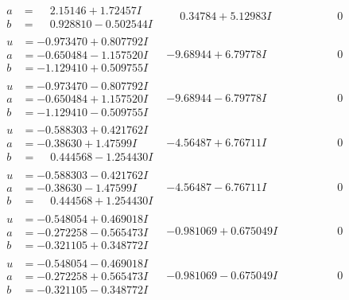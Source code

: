 \documentclass[1p]{elsarticle_modified}
\theoremstyle{definition}
\begin{document}
$$\begin{array}{c|c|c}
\begin{aligned}
a &= \phantom{-}2.15146 + 1.72457 I \\
b &= \phantom{-}0.928810 - 0.502544 I\end{aligned}
 & \phantom{-}0.34784 + 5.12983 I & \phantom{-0.000000 } 0 \\ \hline\begin{aligned}
u &= -0.973470 + 0.807792 I \\
a &= -0.650484 - 1.157520 I \\
b &= -1.129410 + 0.509755 I\end{aligned}
 & -9.68944 + 6.79778 I & \phantom{-0.000000 } 0 \\ \hline\begin{aligned}
u &= -0.973470 - 0.807792 I \\
a &= -0.650484 + 1.157520 I \\
b &= -1.129410 - 0.509755 I\end{aligned}
 & -9.68944 - 6.79778 I & \phantom{-0.000000 } 0 \\ \hline\begin{aligned}
u &= -0.588303 + 0.421762 I \\
a &= -0.38630 + 1.47599 I \\
b &= \phantom{-}0.444568 - 1.254430 I\end{aligned}
 & -4.56487 + 6.76711 I & \phantom{-0.000000 } 0 \\ \hline\begin{aligned}
u &= -0.588303 - 0.421762 I \\
a &= -0.38630 - 1.47599 I \\
b &= \phantom{-}0.444568 + 1.254430 I\end{aligned}
 & -4.56487 - 6.76711 I & \phantom{-0.000000 } 0 \\ \hline\begin{aligned}
u &= -0.548054 + 0.469018 I \\
a &= -0.272258 - 0.565473 I \\
b &= -0.321105 + 0.348772 I\end{aligned}
 & -0.981069 + 0.675049 I & \phantom{-0.000000 } 0 \\ \hline\begin{aligned}
u &= -0.548054 - 0.469018 I \\
a &= -0.272258 + 0.565473 I \\
b &= -0.321105 - 0.348772 I\end{aligned}
 & -0.981069 - 0.675049 I & \phantom{-0.000000 } 0 \\ \hline\begin{aligned}

\end{aligned}
\end{array}$$
\end{document}
